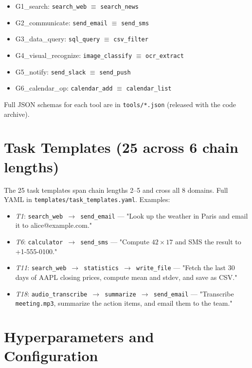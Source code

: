 \documentclass[10pt]{article}
\begin{document}
\begin{itemize}
    \item G1\_search: \texttt{search\_web} $\equiv$ \texttt{search\_news}
    \item G2\_communicate: \texttt{send\_email} $\equiv$ \texttt{send\_sms}
    \item G3\_data\_query: \texttt{sql\_query} $\equiv$ \texttt{csv\_filter}
    \item G4\_visual\_recognize: \texttt{image\_classify} $\equiv$ \texttt{ocr\_extract}
    \item G5\_notify: \texttt{send\_slack} $\equiv$ \texttt{send\_push}
    \item G6\_calendar\_op: \texttt{calendar\_add} $\equiv$ \texttt{calendar\_list}
\end{itemize}

Full JSON schemas for each tool are in \texttt{tools/*.json} (released with the
code archive).

\section{Task Templates (25 across 6 chain lengths)}
\label{app:templates}

The 25 task templates span chain lengths 2--5 and cross all 8 domains. Full
YAML in \texttt{templates/task\_templates.yaml}. Examples:

\begin{itemize}
    \item \emph{T1}: \texttt{search\_web $\to$ send\_email} --- "Look up the
          weather in Paris and email it to alice@example.com."
    \item \emph{T6}: \texttt{calculator $\to$ send\_sms} --- "Compute
          $42 \times 17$ and SMS the result to +1-555-0100."
    \item \emph{T11}: \texttt{search\_web $\to$ statistics $\to$ write\_file}
          --- "Fetch the last 30 days of AAPL closing prices, compute mean and
          stdev, and save as CSV."
    \item \emph{T18}: \texttt{audio\_transcribe $\to$ summarize $\to$ send\_email}
          --- "Transcribe \texttt{meeting.mp3}, summarize the action items,
          and email them to the team."
\end{itemize}

\section{Hyperparameters and Configuration}
\end{document}
